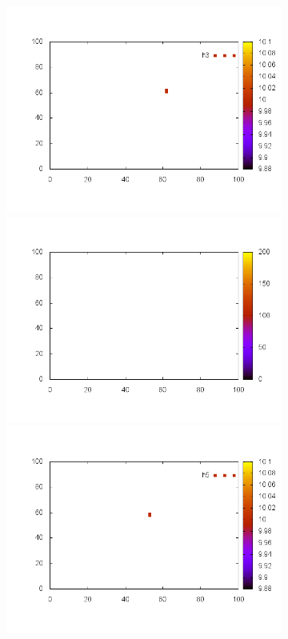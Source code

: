 \documentclass[10pt,a4paper]{article}
\begin{document}
\begin{figure}
\begin{subfigure}[b]{1\textwidth}
\includegraphics[scale=.3]{./img/SCC_Stable3/cut99p/3.png}
\includegraphics[scale=.3]{./img/SCC_Stable3/cut99p/4.png}
\includegraphics[scale=.3]{./img/SCC_Stable3/cut99p/5.png}
\end{subfigure}


\end{figure}
\end{document}
